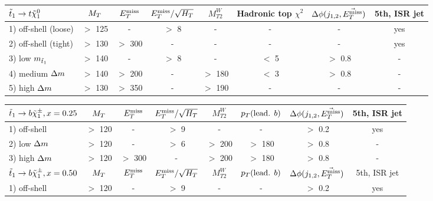 \begin{table}[!ht]
{\footnotesize
\begin{center}
\hspace*{-0.8cm}
    \begin{tabular}{|l|ccccccc|}
    \hline
    $\tilde{t}_1 \rightarrow t\tilde{\chi}_1^0$ & $M_T$   & $E_T^\text{miss}$    & $E_T^\text{miss}/\sqrt{H_T}$  & $M_{T2}^W$ & Hadronic top $\chi^2$ & $\Delta\phi(j_{1,2},\vec{E_T^\text{miss}})$      &   5th, ISR jet \\
    \hline
    1) off-shell (loose)       & $>$ 125 & -       &   $>$ 8            &     -     & -             &          - &    yes        \\
    2) off-shell (tight)       & $>$ 130 & $>$ 300 &   -                &     -     & -        	    &          - &    yes        \\
    3) low    $m_{\tilde{t}_1}$  & $>$ 140 & -       &   $>$ 8            &     -     &  $<$ 5        &  $>$ 0.8   &    -          \\
    4) medium $\Delta m$        & $>$ 140 & $>$ 200 &   -                &  $>$ 180  &  $<$ 3        &  $>$ 0.8   &    -          \\
    5) high   $\Delta m$        & $>$ 130 & $>$ 350 &   -                &  $>$ 190  & -             &          - &    -          \\
        \hline
    \end{tabular}
    \hspace*{-0.5cm}
    \begin{tabular}{|l|ccccccc|}
    \hline
    $\tilde{t}_1 \rightarrow b\tilde{\chi}_1^\pm, x=0.25$   & $M_T$     & $E_T^\text{miss}$    & $E_T^\text{miss}/\sqrt{H_T}$ & $M_{T2}^W$ & $p_T(\text{lead. }b)$ & $\Delta\phi(j_{1,2},\vec{E_T^\text{miss}})$ & 5th, ISR jet  \\
    \hline
    1) off-shell        & $>$ 120   &  -       &    $>$  9       &     -      &   -                   &  $>$ 0.2      & yes           \\
    2) low    $\Delta m$ & $>$ 120   &  -       &    $>$  6       &  $>$ 200   & $>$ 180               &  $>$ 0.8      & -             \\
    3) high   $\Delta m$ & $>$ 120   & $>$ 300  &     -           &  $>$ 200   & $>$ 180               &  $>$ 0.8      & -             \\
    \hline
    $\tilde{t}_1 \rightarrow b\tilde{\chi}_1^\pm, x=0.50$     & $M_T$     & $E_T^\text{miss}$    & $E_T^\text{miss}/\sqrt{H_T}$ & $M_{T2}^W$ & $p_T(\text{lead. }b)$ & $\Delta\phi(j_{1,2},\vec{E_T^\text{miss}})$ & 5th, ISR jet  \\
    \hline
    1) off-shell        &  $>$ 120  &   -      &  $>$  9         &    -       & -                     &  $>$ 0.2      & yes           \\

\end{tabular}
\end{center}}
\end{table}
